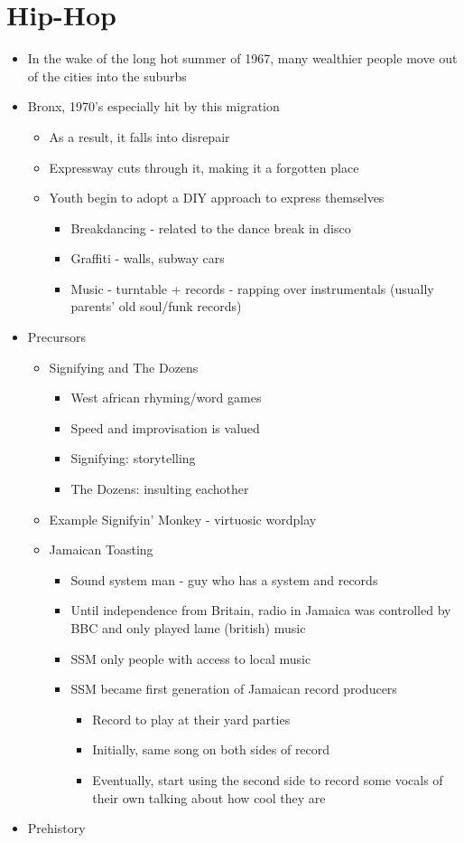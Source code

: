 \documentclass[11pt]{report}
\newcommand{\bl}{\begin{itemize}}
\newcommand{\kl}{\end{itemize}}
\begin{document}
\section{Hip-Hop}
\begin{itemize}
	\item In the wake of the long hot summer of 1967, many wealthier people move out of the cities into the suburbs
	\item Bronx, 1970's especially hit by this migration
	\bl
		\item As a result, it falls into disrepair
		\item Expressway cuts through it, making it a forgotten place
		\item Youth begin to adopt a DIY approach to express themselves
		\bl
			\item Breakdancing - related to the dance break in disco
			\item Graffiti - walls, subway cars
			\item Music - turntable + records - rapping over instrumentals (usually parents' old soul/funk records)
		\kl
	\kl
	\item Precursors
	\bl
		\item Signifying and The Dozens
		\bl
			\item West african rhyming/word games
			\item Speed and improvisation is valued
			\item Signifying: storytelling
			\item The Dozens: insulting eachother
		\kl
		\item Example Signifyin' Monkey - virtuosic wordplay
		\item Jamaican Toasting
		\bl
			\item Sound system man - guy who has a system and records
			\item Until independence from Britain, radio in Jamaica was controlled by BBC and only played lame (british) music
			\item SSM only people with access to local music
			\item SSM became first generation of Jamaican record producers
			\bl
				\item Record to play at their yard parties
				\item Initially, same song on both sides of record
				\item Eventually, start using the second side to record some vocals of their own talking about how cool they are
			\kl
		\kl
	\kl
	\item Prehistory

\end{itemize}
\end{document}
